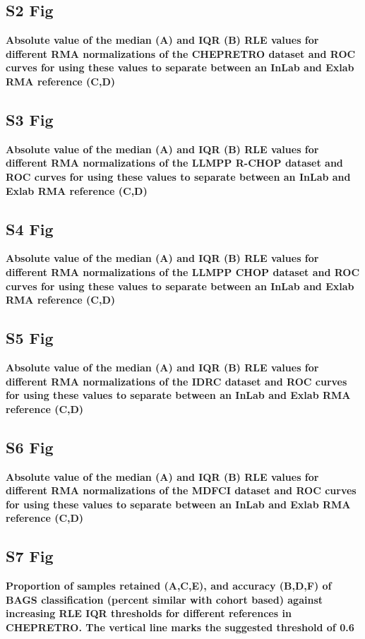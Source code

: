 \documentclass[10pt,letterpaper]{article}
\begin{document}
\subsection*{S2 Fig} \label{fig:chep_rle}
{\bf Absolute value of the median (A) and IQR (B) RLE values for different RMA normalizations of the CHEPRETRO dataset and ROC curves for using these values to separate between an InLab and Exlab RMA reference (C,D)}

\subsection*{S3 Fig} \label{fig:rchop_rle}
{\bf Absolute value of the median (A) and IQR (B) RLE values for different RMA normalizations of the LLMPP R-CHOP dataset and ROC curves for using these values to separate between an InLab and Exlab RMA reference (C,D)}

\subsection*{S4 Fig} \label{fig:chop_rle}
{\bf Absolute value of the median (A) and IQR (B) RLE values for different RMA normalizations of the LLMPP CHOP dataset and ROC curves for using these values to separate between an InLab and Exlab RMA reference (C,D)}

\subsection*{S5 Fig} \label{fig:idrc_rle}
{\bf Absolute value of the median (A) and IQR (B) RLE values for different RMA normalizations of the IDRC dataset and ROC curves for using these values to separate between an InLab and Exlab RMA reference (C,D)}

\subsection*{S6 Fig} \label{fig:mdfci_rle}
{\bf Absolute value of the median (A) and IQR (B) RLE values for different RMA normalizations of the MDFCI dataset and ROC curves for using these values to separate between an InLab and Exlab RMA reference (C,D)}

\subsection*{S7 Fig} \label{fig:chep_rle_clas_bags}
{\bf Proportion of samples retained (A,C,E), and accuracy (B,D,F) of BAGS classification (percent similar with cohort based) against increasing RLE IQR thresholds for different references in CHEPRETRO. The vertical line marks the suggested threshold of 0.6}
\end{document}
